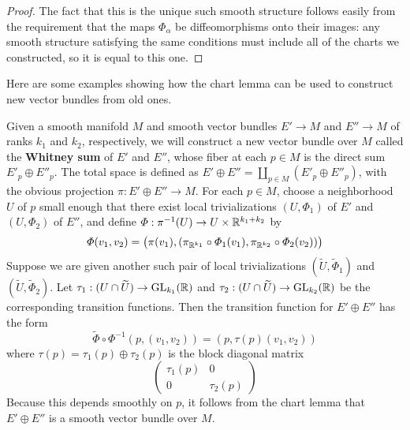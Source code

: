 \begin{proof}
The fact that this is the unique such smooth structure follows easily from the requirement that the maps $\varPhi_\alpha$ be diffeomorphisms onto their images: any smooth structure satisfying the same conditions must include all of the charts we constructed, so it is equal to this one.
\end{proof}
Here are some examples showing how the chart lemma can be used to construct new vector bundles from old ones.
\begin{example}
Given a smooth manifold $M$ and smooth vector bundles $E'\to M$ and $E''\to M$ of ranks $k_1$ and $k_2$, respectively, we will construct a new vector bundle over $M$ called the \textbf{Whitney sum} of $E'$ and $E''$, whose fiber at each $p\in M$ is the direct sum $E'_p\oplus E''_p$. The total space is defined as $E'\oplus E''=\coprod_{p\in M}(E'_p\oplus E''_p)$, with the obvious projection $\pi:E'\oplus E''\to M$. For each $p\in M$, choose a neighborhood $U$ of $p$ small enough that there exist local trivializations $(U,\varPhi_1)$ of $E'$ and $(U,\varPhi_2)$ of $E''$, and define $\varPhi:\pi^{-1}(U)\to U\times\mathbb{R}^{k_1+k_2}$ by 
\[\varPhi(v_1,v_2)=\big(\pi(v_1),(\pi_{\mathbb{R}^{k_1}}\circ\varPhi_1(v_1),\pi_{\mathbb{R}^{k_2}}\circ\varPhi_2(v_2))\big)\]
Suppose we are given another such pair of local trivializations $(\widetilde{U},\widetilde{\varPhi}_1)$ and $(\widetilde{U},\widetilde{\varPhi}_2)$. Let $\tau_1:(U\cap\widetilde{U})\to\mathrm{GL}_{k_1}(\mathbb{R})$ and $\tau_2:(U\cap\widetilde{U})\to\mathrm{GL}_{k_2}(\mathbb{R})$ be the corresponding transition functions. Then the transition function for $E'\oplus E''$ has the form
\[\widetilde{\varPhi}\circ\varPhi^{-1}(p,(v_1,v_2))=(p,\tau(p)(v_1,v_2))\]
where $\tau(p)=\tau_1(p)\oplus\tau_2(p)$ is the block diagonal matrix
\[\begin{pmatrix}
\tau_1(p)&0\\
0&\tau_2(p)
\end{pmatrix}\]
Because this depends smoothly on $p$, it follows from the chart lemma that $E'\oplus E''$ is a smooth vector bundle over $M$.
\end{example}
